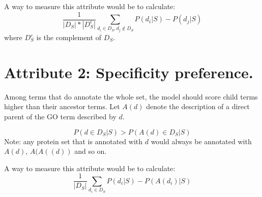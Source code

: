 \documentclass{specification}
\begin{document}
A way to measure this attribute would be to calculate: 
\[\frac{1}{|D_{S}|*|D_{S}^{c}|}\sum_{d_i \in D_{S}, d_j \notin D_{S}} P(d_i | S) - P(d_j | S)\]
where $D_{S}^{c}$ is the complement of $D_{S}$.

\section*{Attribute 2: Specificity preference.}

Among terms that do annotate the whole set, the model should score child terms higher than their ancestor terms. Let $A(d)$ denote the description of a direct parent of the GO term described by $d$.

\[P(d \in D_{S}| S) > P(A(d) \in D_{S}| S)\]
Note: any protein set that is annotated with $d$ would always be annotated with $A(d)$, $A(A((d))$ and so on.

A way to measure this attribute would be to calculate:
\[\frac{1}{|D_{S}|}\sum_{d_i \in D_{S}} P(d_i | S) - P(A(d_i) | S)\]







\end{document}
